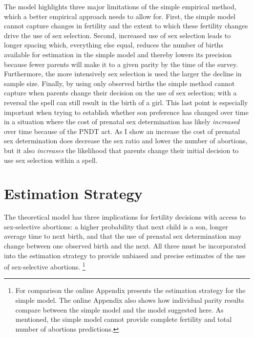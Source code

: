 \documentclass[12pt,letterpaper]{article}
\begin{document}


The model highlights three major limitations of the simple 
empirical method, which a better empirical approach needs to 
allow for.
First, the simple model cannot capture changes in fertility and the extent 
to which these fertility changes drive the use of sex selection.
Second, increased use of sex selection leads to longer spacing which,
everything else equal, reduces the number of births available for 
estimation in the simple model and thereby lowers its precision
because fewer parents will make it to a given parity by the time of the survey.
Furthermore, the more intensively sex selection is used the larger 
the decline in sample size.
Finally, by using only observed births the simple method cannot capture
when parents change their decision on the use of sex selection;
with a reversal the spell can still result in the birth of a girl.
This last point is especially important when trying to establish whether 
son preference has changed over time in a situation where the cost of prenatal 
sex determination has likely \emph{increased} over time because of the PNDT act.
As I show an increase the cost of prenatal sex determination does 
decrease the sex ratio and lower the number of abortions, but 
it also \emph{increases} the likelihood that parents change their initial
decision to use sex selection within a spell.




\section{Estimation Strategy\label{sec:strategy}}

The theoretical model has three implications for fertility decisions with access to 
sex-selective abortions: 
a higher probability that next child is a son, 
longer average time to next birth, 
and that the use of prenatal sex determination may change between one observed birth and 
the next.
All three must be incorporated into the estimation strategy
to provide unbiased and precise estimates of the use of sex-selective abortions.%
\footnote{
For comparison the online Appendix presents the estimation strategy 
for the simple model.
The online Appendix also shows how individual parity results compare 
between the simple model and the model suggested here.
As mentioned, the simple model cannot provide complete fertility 
and total number of abortions predictions.
}
\end{document}
